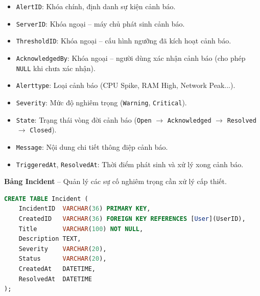 \begin{itemize}[leftmargin=2em]
    \item \texttt{AlertID}: Khóa chính, định danh sự kiện cảnh báo.
    \item \texttt{ServerID}: Khóa ngoại -- máy chủ phát sinh cảnh báo.
    \item \texttt{ThresholdID}: Khóa ngoại -- cấu hình ngưỡng đã kích hoạt cảnh báo.
    \item \texttt{AcknowledgedBy}: Khóa ngoại -- người dùng xác nhận cảnh báo (cho phép \texttt{NULL} khi chưa xác nhận).
    \item \texttt{Alerttype}: Loại cảnh báo (CPU Spike, RAM High, Network Peak...).
    \item \texttt{Severity}: Mức độ nghiêm trọng (\texttt{Warning}, \texttt{Critical}).
    \item \texttt{State}: Trạng thái vòng đời cảnh báo (\texttt{Open} $\rightarrow$ \texttt{Acknowledged} $\rightarrow$ \texttt{Resolved} $\rightarrow$ \texttt{Closed}).
    \item \texttt{Message}: Nội dung chi tiết thông điệp cảnh báo.
    \item \texttt{TriggeredAt}, \texttt{ResolvedAt}: Thời điểm phát sinh và xử lý xong cảnh báo.
\end{itemize}

\vspace{0.5em}
\noindent\textbf{Bảng Incident} -- Quản lý các sự cố nghiêm trọng cần xử lý cấp thiết.

\begin{tcolorbox}[colback=gray!5, colframe=gray!60, title={\textbf{CREATE TABLE Incident}}, fonttitle=\bfseries\small, boxrule=0.5pt, arc=2pt]
\begin{lstlisting}[language=SQL, basicstyle=\ttfamily\small, breaklines=true, showstringspaces=false, keywordstyle=\bfseries\color{blue!70!black}, stringstyle=\color{red!70!black}, commentstyle=\itshape\color{green!50!black}]
CREATE TABLE Incident (
    IncidentID  VARCHAR(36) PRIMARY KEY,
    CreatedID   VARCHAR(36) FOREIGN KEY REFERENCES [User](UserID),
    Title       VARCHAR(100) NOT NULL,
    Description TEXT,
    Severity    VARCHAR(20),
    Status      VARCHAR(20),
    CreatedAt   DATETIME,
    ResolvedAt  DATETIME
);
\end{lstlisting}
\end{tcolorbox}

